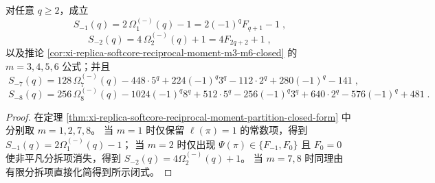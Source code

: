 \begin{corollary}[倒数一次至八次矩的完全闭式]\label{cor:xi-replica-softcore-reciprocal-moment-m1-m8-closed}
对任意 \(q\ge 2\)，成立
\[
\boxed{\;
S_{-1}(q)=2\,\Omega_1^{(-)}(q)-1=2(-1)^qF_{q+1}-1\;},
\]
\[
\boxed{\;
S_{-2}(q)=4\,\Omega_2^{(-)}(q)+1=4F_{2q+2}+1\;},
\]
以及推论 \ref{cor:xi-replica-softcore-reciprocal-moment-m3-m6-closed} 的 \(m=3,4,5,6\) 公式；并且
\[
\boxed{\;
S_{-7}(q)=128\,\Omega_7^{(-)}(q)-448\cdot 5^{q}+224(-1)^q 3^{q}-112\cdot 2^{q}+280(-1)^q-141\;},
\]
\[
\boxed{\;
S_{-8}(q)=256\,\Omega_8^{(-)}(q)-1024(-1)^q 8^{q}+512\cdot 5^{q}-256(-1)^q 3^{q}+640\cdot 2^{q}-576(-1)^q+481\; }.
\]
\end{corollary}
\begin{proof}
在定理 \ref{thm:xi-replica-softcore-reciprocal-moment-partition-closed-form} 中分别取 \(m=1,2,7,8\)。
当 \(m=1\) 时仅保留 \(\ell(\pi)=1\) 的常数项，得到 \(S_{-1}(q)=2\Omega_1^{(-)}(q)-1\)；
当 \(m=2\) 时仅出现 \(\Psi(\pi)\in\{F_{-1},F_0\}\) 且 \(F_0=0\) 使非平凡分拆项消失，得到 \(S_{-2}(q)=4\Omega_2^{(-)}(q)+1\)。
当 \(m=7,8\) 时同理由有限分拆项直接化简得到所示闭式。
\end{proof}

